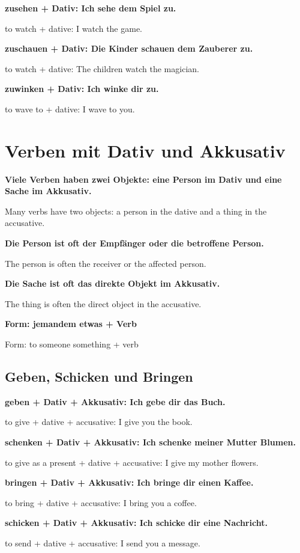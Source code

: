 \documentclass[a4paper]{article}
\newcommand{\EN}[1]{\par{\small\textcolor{TranslationGray}{#1}}\vspace{0.4em}}
\begin{document}
            \textbf{zusehen + Dativ: Ich sehe dem Spiel zu.}
            \EN{to watch + dative: I watch the game.}
            
            \textbf{zuschauen + Dativ: Die Kinder schauen dem Zauberer zu.}
            \EN{to watch + dative: The children watch the magician.}
            
            \textbf{zuwinken + Dativ: Ich winke dir zu.}
            \EN{to wave to + dative: I wave to you.}
    
    
    \section{Verben mit Dativ und Akkusativ}
        
        \textbf{Viele Verben haben zwei Objekte: eine Person im Dativ und eine Sache im Akkusativ.}
        \EN{Many verbs have two objects: a person in the dative and a thing in the accusative.}
        
        \textbf{Die Person ist oft der Empfänger oder die betroffene Person.}
        \EN{The person is often the receiver or the affected person.}
        
        \textbf{Die Sache ist oft das direkte Objekt im Akkusativ.}
        \EN{The thing is often the direct object in the accusative.}
        
        \textbf{Form: jemandem etwas + Verb}
        \EN{Form: to someone something + verb}
        
        \subsection{Geben, Schicken und Bringen}
            
            \textbf{geben + Dativ + Akkusativ: Ich gebe dir das Buch.}
            \EN{to give + dative + accusative: I give you the book.}
            
            \textbf{schenken + Dativ + Akkusativ: Ich schenke meiner Mutter Blumen.}
            \EN{to give as a present + dative + accusative: I give my mother flowers.}
            
            \textbf{bringen + Dativ + Akkusativ: Ich bringe dir einen Kaffee.}
            \EN{to bring + dative + accusative: I bring you a coffee.}
            
            \textbf{schicken + Dativ + Akkusativ: Ich schicke dir eine Nachricht.}
            \EN{to send + dative + accusative: I send you a message.}
            
\end{document}
